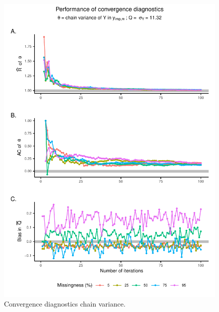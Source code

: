 \documentclass[Royal,times,sageh]{sagej}
\begin{document}
\begin{figure}

{\centering \includegraphics{manuscript_files/figure-latex/sd-1} 

}

\caption{Convergence diagnostics chain variance.}\label{fig:sd}
\end{figure}
\end{document}
